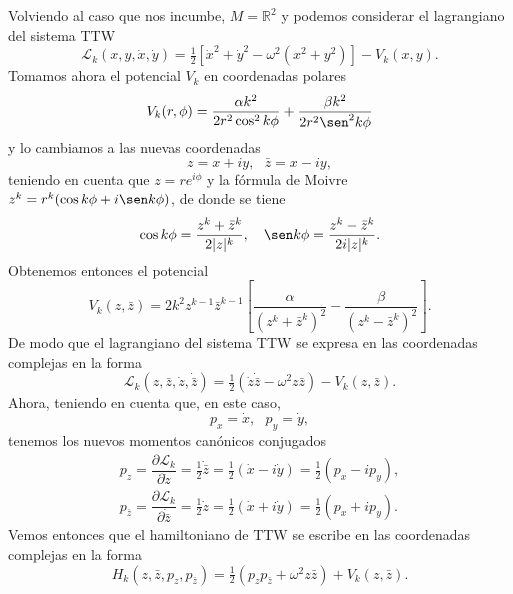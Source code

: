 \documentclass[11pt,a4paper,twoside]{article}
\theoremstyle{definition} \newtheorem{defn}[thm]{Definición}
\theoremstyle{definition} \newtheorem{ejemplo}[thm]{Ejemplo}
\theoremstyle{definition} \newtheorem{ejercicio}[thm]{Ejercicio}
\theoremstyle{remark} \newtheorem*{obs}{Observación}
\def\RR{\mathbb{R}}
\def\zz{\bar{z}}
\begin{document}
     Volviendo al caso que nos incumbe, $M=\RR^2$ y podemos considerar el lagrangiano del sistema TTW
     \begin{equation}
       \mathcal{L}_k(x,y,\dot{x},\dot{y})=\tfrac{1}{2}[\dot{x}^2+\dot{y}^2-\omega^2(x^2+y^2)]-V_k(x,y).
     \end{equation}
     Tomamos ahora el potencial $V_k$ en coordenadas polares
\begin{equation}
  V_k(r,\phi)=\frac{\alpha k^2}{2r^2\cos^2 k\phi}+\frac{\beta k^2}{2r^2\sen^2 k\phi}
\end{equation}
y lo cambiamos a las nuevas coordenadas
\begin{equation}
    z=x+iy, \ \ \
    \bar{z}=x-iy,
\end{equation}
teniendo en cuenta que $z=r e^{i\phi}$ y la fórmula de Moivre
  $z^k=r^k(\cos k\phi+i\sen k\phi)$,
de donde se tiene
\begin{equation*}
  \cos k\phi = \frac{z^k+\zz^k}{2|z|^k},\ \ \  \sen k\phi = \frac{z^k-\zz^k}{2i|z|^k}. 
\end{equation*}
Obtenemos entonces el potencial
\begin{equation}
V_k(z,\zz)=2k^2z^{k-1}\zz^{k-1}\left[\frac{\alpha  }{(z^k+\zz^k)^2}-\frac{\beta  }{(z^k-\zz^k)^2}\right].
\end{equation}
De modo que el lagrangiano del sistema TTW se expresa en las coordenadas complejas en la forma
\begin{equation}
  \mathcal{L}_k(z,\zz,\dot{z},\dot{\zz})=\tfrac{1}{2}(\dot{z}\dot{\zz}-\omega^2 z \zz) - V_k(z,\zz).
\end{equation}
Ahora, teniendo en cuenta que, en este caso,
\begin{equation}
    p_x=\dot{x},\ \ \
    p_y=\dot{y},
\end{equation}
tenemos los nuevos momentos canónicos conjugados
\begin{align}
    p_z=\dfrac{\partial \mathcal{L}_k }{\partial \dot{z}}=\tfrac{1}{2} \dot{\zz}=\tfrac{1}{2}(\dot{x}-i\dot{y})=\tfrac{1}{2}(p_x-ip_y),\\
    p_{\zz}=\dfrac{\partial \mathcal{L}_k }{\partial \dot{\zz}}=\tfrac{1}{2} \dot{z}=\tfrac{1}{2}(\dot{x}+i\dot{y})=\tfrac{1}{2}(p_x+ip_y).
\end{align}
Vemos entonces que el hamiltoniano de TTW se escribe en las coordenadas complejas en la forma
\begin{equation}
  H_k(z,\zz,p_z,p_{\zz})=\tfrac{1}{2}(p_zp_{\zz}+\omega^2 z \zz) + V_k(z,\zz).
\end{equation}
\end{document}
